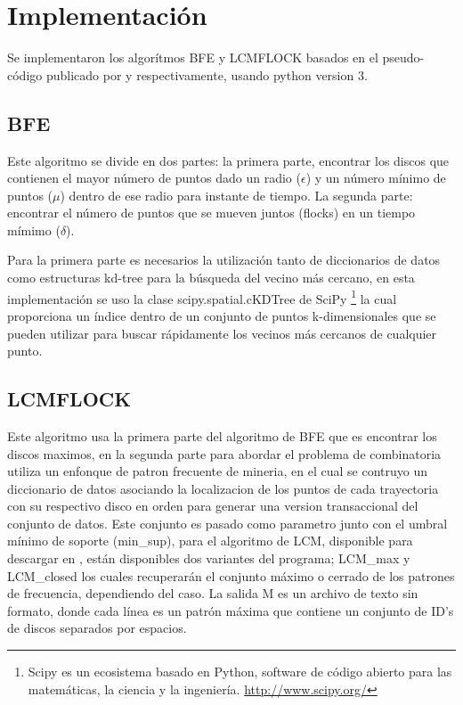 \section{Implementación}

Se implementaron los algorítmos BFE y LCMFLOCK basados en el pseudo-código publicado por \cite{vieira2009line}  y \cite{romero2011mining} respectivamente,
usando python version 3.

\subsection{BFE}

Este algoritmo se divide en dos partes: la primera parte, encontrar los discos que contienen el mayor número de puntos
dado un radio ($\epsilon$) y un número mínimo de puntos ($\mu$) dentro de ese radio para instante de tiempo. La segunda parte: encontrar
el número de puntos que se mueven juntos (flocks) en un tiempo mímimo ($\delta$).

Para la primera parte es necesarios la utilización tanto de diccionarios de datos como
estructuras kd-tree para la búsqueda del vecino más cercano, en esta implementación se uso la clase scipy.spatial.cKDTree de
SciPy \footnote{Scipy es un ecosistema basado en Python, software de código abierto para las matemáticas, la ciencia y la ingeniería.
\url{http://www.scipy.org/}} la cual proporciona  un índice dentro de un conjunto de puntos k-dimensionales que se pueden utilizar
para buscar rápidamente los vecinos más cercanos de cualquier punto.

\subsection{LCMFLOCK}

Este algoritmo usa la primera parte del algoritmo de BFE que es encontrar los discos maximos, en la segunda parte para abordar el problema
de combinatoria utiliza un enfonque de patron frecuente de mineria, en el cual se contruyo un diccionario de datos asociando la localizacion 
de los puntos de cada trayectoria con su respectivo disco en orden para generar una version transaccional del conjunto de datos. Este conjunto
es pasado como parametro junto con el umbral mínimo de soporte (min\_sup), para el algoritmo de LCM, disponible para descargar en \cite{FIMIHomep},
 están disponibles dos variantes del programa; LCM\_max y LCM\_closed los cuales recuperarán el conjunto máximo o cerrado de los patrones de 
 frecuencia, dependiendo del caso. La salida M es un archivo de texto sin formato, donde cada línea es un patrón máxima que 
 contiene un conjunto de ID's de discos separados por espacios.